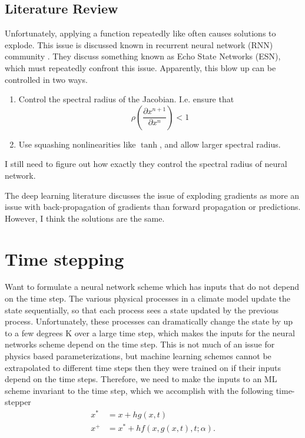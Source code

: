 \documentclass{report}
\newcommand{\1}[1]{\mathds{1}\left[#1\right]}
\begin{document}
\subsection{Literature Review}
\label{sec:blowup-rnn}


Unfortunately, applying a function repeatedly like often causes solutions to
explode. 
This issue is discussed known in recurrent neural network (RNN) community
\autocite[See Ch. 
10.7]{Goodfellow2016}.
They discuss something known as Echo State Networks (ESN), which must repeatedly
confront this issue. Apparently, this blow up can be controlled in two ways.
\begin{enumerate}
\item Control the spectral radius of the Jacobian. I.e. ensure that
  \[\rho \left( \frac{\partial x^{n+1}}{\partial x^n} \right) < 1\]
  
\item Use squashing nonlinearities like $\tanh$, and allow larger spectral radius.
\end{enumerate}

I still need to figure out how exactly they control the spectral radius of
neural network.

The deep learning literature discusses the issue of exploding gradients as more
an issue with back-propagation of gradients than forward propagation or
predictions. However, I think the solutions are the same.


\section{Time stepping}

Want to formulate a neural network scheme which has inputs that do not depend on the time step. 
The various physical processes in a climate model update the state sequentially, so that each process sees a state updated by the previous process.
Unfortunately, these processes can dramatically change the state by up to a few degrees K over a large time step, which makes the inputs for the neural networks scheme depend on the time step.
This is not much of an issue for physics based parameterizations, but machine learning schemes cannot be extrapolated to different time steps then they were trained on if their inputs depend on the time steps.
Therefore, we need to make the inputs to an ML scheme invariant to the time step, which we accomplish with the following time-stepper
\begin{align}
 x^* &= x + h g(x, t) \\
 x^{+} &= x^* + h f(x, g(x, t), t; \alpha).
\end{align}
\end{document}
